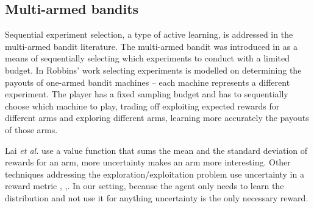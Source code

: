 \subsection{Multi-armed bandits}

Sequential experiment selection, a type of active learning, is addressed in the
multi-armed bandit literature.  The multi-armed bandit was introduced in
\cite{robbins1952some} as a means of sequentially selecting which experiments
to conduct with a limited budget.  In Robbins' work \cite{robbins1952some}
selecting experiments is modelled on determining the payouts of one-armed
bandit machines -- each machine represents a different experiment.  The player
has a fixed sampling budget and has to sequentially choose which machine to
play, trading off exploiting expected rewards for different arms and
exploring different arms, learning more accurately the payouts of those
arms.  


Lai \emph{et al.} use a value function that sums the mean and the standard deviation of rewards for an arm, more uncertainty makes an arm more interesting.  Other techniques addressing the exploration/exploitation problem use uncertainty in a reward metric \cite{burnetas1997optimal}, \cite{auer2003using},\cite{balcan2006agnostic}.  In our setting, because the agent only needs to learn the distribution and not use it for anything uncertainty is the only necessary reward.

% 
% 
% 
% 
% 

